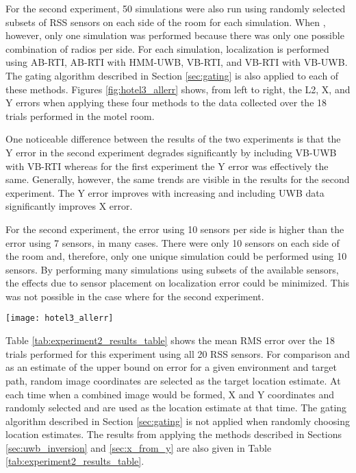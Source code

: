 \documentclass[conference]{IEEEtran}
\begin{document}
For the second experiment, 50 simulations were also run using randomly
selected subsets of  RSS sensors on each side of the room for each
simulation. When , however, only one simulation was performed
because there was only one possible combination of  radios per
side. For each simulation, localization is performed using AB-RTI,
AB-RTI with HMM-UWB, VB-RTI, and VB-RTI with VB-UWB.
The gating algorithm described in Section \ref{sec:gating} is also
applied to each of these methods. Figures \ref{fig:hotel3_allerr}
shows, from left to right, the L2, X, and Y errors when applying these
four methods to the data collected over the 18 trials performed in the
motel room.

One noticeable difference between the results of the two experiments
is that the Y error in the second experiment degrades significantly by
including VB-UWB with VB-RTI whereas for the first experiment the Y
error was effectively the same. Generally, however, the same trends
are visible in the results for the second experiment. The Y error
improves with increasing  and including UWB data significantly
improves X error.

For the second experiment, the error using 10 sensors per side is
higher than the error using 7 sensors, in many cases. There were only
10 sensors on each side of the room and, therefore, only one unique
simulation could be performed using 10 sensors. By performing many
simulations using subsets of the available sensors, the effects due to
sensor placement on localization error could be minimized. This was
not possible in the case where  for the second experiment.

\begin{figure*}[htb]
    \centerline{\texttt{[image: hotel3\_allerr]}}
    \caption{From left to right, the mean RMS L2, X, and Y errors over
      the 18 trials and 50 simulations using random subsets of 
      sensors per side of the motel room. When , only 1
      simulation was performed.}
    \label{fig:hotel3_allerr}
\end{figure*}

Table \ref{tab:experiment2_results_table} shows the mean RMS error
over the 18 trials performed for this experiment using all 20 RSS
sensors. For comparison and as an estimate of the upper bound on error
for a given environment and target path, random image coordinates are
selected as the target location estimate. At each time when a combined
image would be formed, X and Y coordinates and randomly selected and
are used as the location estimate at that time. The gating algorithm
described in Section \ref{sec:gating} is not applied when randomly
choosing location estimates. The results from applying the methods
described in Sections \ref{sec:uwb_inversion} and \ref{sec:x_from_y}
are also given in Table \ref{tab:experiment2_results_table}.
\end{document}

